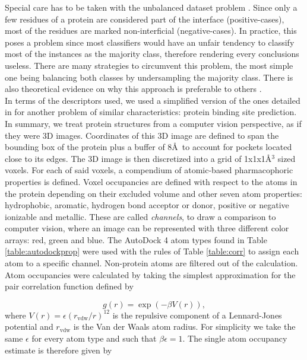 \documentclass[10pt,a4paper,twoside]{book}
\begin{document}
Special care has to be taken with the unbalanced dataset problem \cite{Longadge2013}. Since only a few residues of a protein are considered part of the interface (positive-cases), most of the residues are marked non-interficial (negative-cases). In practice, this poses a problem since most classifiers would have an unfair tendency to classify most of the instances as the majority class, therefore rendering every conclusions useless. There are many strategies to circumvent this problem, the most simple one being balancing both classes by undersampling the majority class. There is also theoretical evidence on why this approach is preferable to others \cite{Wallace2011}.  \\ 

In terms of the descriptors used, we used a simplified version of the ones detailed in \cite{Jimenez2017} for another problem of similar characteristics: protein binding site prediction. In summary, we treat protein structures from a computer vision perspective, as if they were 3D images. Coordinates of this 3D image are defined to span the bounding box of the protein plus a buffer of 8\AA\ to account for pockets located close to its edges. The 3D image is then discretized into a grid of 1x1x1\AA$^3$ sized voxels. For each of said voxels, a compendium of atomic-based pharmacophoric properties is defined. Voxel occupancies are defined with respect to the atoms in the protein depending on their excluded volume and other seven atom properties: hydrophobic, aromatic, hydrogen bond acceptor or donor, positive or negative ionizable and metallic. These are called \textit{channels}, to draw a comparison to computer vision, where an image can be represented with three different color arrays: red, green and blue. The AutoDock 4 \cite{Morris2009} atom types found in Table \ref{table:autodockprop} were used with the rules of Table \ref{table:corr} to assign each atom to a specific channel. Non-protein atoms are filtered out of the calculation. Atom occupancies were calculated by taking the simplest approximation for the pair correlation function defined by


\begin{equation}
    g(r) = \exp\left(-\beta V(r)\right), \label{gr_eq}
\end{equation}
where $V(r)=\epsilon (r_\mathrm{vdw}/r)^{12}$ is the repulsive component of a Lennard-Jones potential and $r_{\mathrm{vdw}}$ is the Van der Waals atom radius. For simplicity we take the same $\epsilon$ for every atom type and such that $\beta \epsilon=1$. The single atom occupancy estimate is therefore given by
\end{document}
